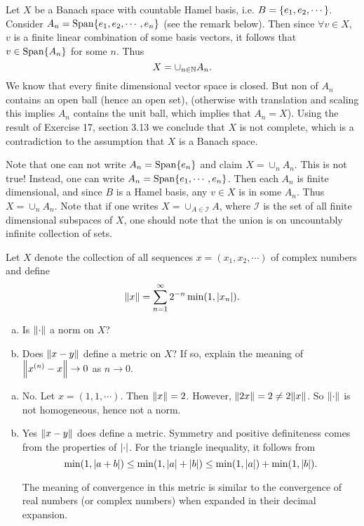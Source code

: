 \begin{solution}
	Let $ X $ be a Banach space with countable Hamel basis, i.e. $ B = \{e_1,e_2,\cdots\} $. Consider $ A_n = \operatorname{Span}\{e_1,e_2,\cdots,e_n\} $ (see the remark below). Then since $ \forall v\in X $, $ v $ is a finite linear combination of some basis vectors, it follows that $ v \in \operatorname{Span}\{A_n\} $ for some $ n $. Thus
	\[ X = \cup_{n\in \mathbb{N}} A_n. \] 
	We know that every finite dimensional vector space is closed. But non of $ A_n $ contains an open ball (hence an open set), (otherwise with translation and scaling this implies $ A_n $ contains the unit ball, which implies that $ A_n = X $). Using the result of Exercise 17, section 3.13 we conclude that $ X $ is not complete, which is a contradiction to the assumption that $ X $ is a Banach space. 
\end{solution}
\begin{remark}
	Note that one can not write $ A_n = \operatorname{Span}\{e_n\} $ and claim $ X = \cup_n A_n $. This is not true! Instead, one can write $ A_n = \operatorname{Span}\{e_1,\cdots,e_n\} $. Then each $ A_n $ is finite dimensional, and since $ B $ is a Hamel basis, any $ v\in X $ is in some $ A_n $. Thus $ X = \cup_n A_n $. Note that if one writes $ X = \cup_{A\in \mathcal{I}}A $, where $ \mathcal{I} $ is the set of all finite dimensional subspaces of $ X $, one should note that the union is on uncountably infinite collection of sets.
\end{remark}

\begin{problem}
	Let $ X $ denote the collection of all sequences $ x=  (x_1,x_2,\cdots) $ of complex numbers and define
	\[ \norm{x} = \sum_{n=1}^{\infty}2^{-n}\min(1,\left|x_n\right|). \]
	\begin{enumerate}[(a)]
		\item Is $ \norm{\cdot} $ a norm on $ X $?
		\item Does $ \norm{x-y} $ define a metric on $ X $? If so, explain the meaning of $ \norm{x^{(n)}-x}\to 0 $ as $ n\to0 $.
	\end{enumerate}
\end{problem}
\begin{solution}
	\begin{enumerate}[(a)]
		\item No. Let $ x = (1,1,\cdots) $. Then $ \norm{x} = 2 $. However, $ \norm{2x} = 2 \neq 2\norm{x} $. So $ \norm{\cdot} $ is not homogeneous, hence not a norm.
		
		\item Yes $ \norm{x-y} $ does define a metric. Symmetry and positive definiteness comes from the properties of $ \left|\cdot\right| $. For the triangle inequality, it follows from
		\[ \min(1,\left|a+b\right|) \leq \min(1,\left|a\right| + \left|b\right|) \leq \min(1,\left|a\right|) + \min(1,\left|b\right|).  \]
		
		The meaning of convergence in this metric is similar to the convergence of real numbers (or complex numbers) when expanded in their decimal expansion. 
 	\end{enumerate}
\end{solution}

